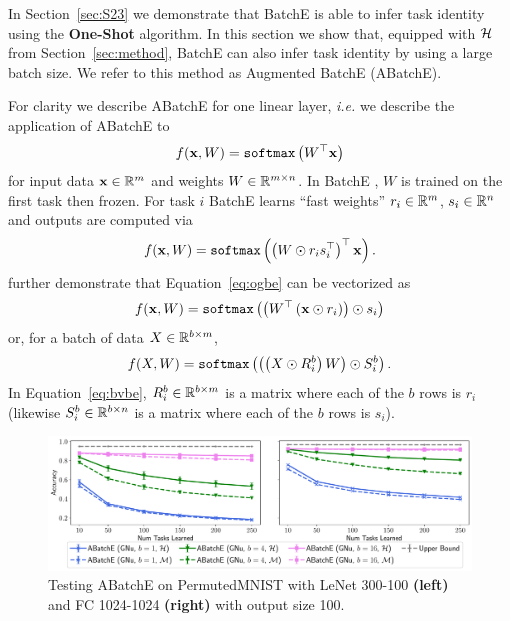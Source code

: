 \documentclass{article}
\begin{document}
In Section~\ref{sec:S23} we demonstrate that BatchE \cite{wen2020batchensemble} is able to infer task identity using the \textbf{One-Shot} algorithm. In this section we show that, equipped with $\mathcal{H}$ from Section~\ref{sec:method}, BatchE can also infer task identity by using a large batch size. We refer to this method as Augmented BatchE (ABatchE).

For clarity we describe ABatchE for one linear layer, \textit{i.e.} we describe the application of ABatchE to
\begin{align}
    f(\mathbf{x}, W) = \texttt{softmax}\left( W^\top \mathbf{x} \right)
\end{align}
for input data $\mathbf{x} \in \mathbb{R}^m$ and weights  $W \in \mathbb{R}^{m \times n}$. In BatchE \cite{wen2020batchensemble}, $W$ is trained on the first task then frozen. For task $i$ BatchE learns ``fast weights'' $r_i \in \mathbb{R}^{m}$, $s_i \in \mathbb{R}^{n}$ and outputs are computed via
\begin{align} \label{eq:ogbe}
    f(\mathbf{x}, W) = \texttt{softmax}\left( \left( W \odot r_i s_i^\top   \right)^\top \mathbf{x} \right).
\end{align}
\citet{wen2020batchensemble} further demonstrate that Equation~\ref{eq:ogbe} can be vectorized as
\begin{align} \label{eq:vbe}
    f(\mathbf{x}, W) = \texttt{softmax}\left(  \left( W^\top \left( \mathbf{x} \odot r_i  \right) \right) \odot s_i  \right)
\end{align}
or, for a batch of data $X \in \mathbb{R}^{b \times m}$,
\begin{align} \label{eq:bvbe}
    f(X, W) = \texttt{softmax}\left(  \left( \left( X \odot R^{b}_i  \right)  W \right) \odot S^{b}_i  \right).
\end{align}
In Equation~\ref{eq:bvbe}, $R^b_i \in \mathbb{R}^{b \times m}$ is a matrix where each of the $b$ rows is $r_i$ (likewise $S^b_i \in \mathbb{R}^{b \times n}$ is a matrix where each of the $b$ rows is $s_i$).
\begin{figure}[t]
    \centering
    \includegraphics[width=\textwidth]{figs/abe.pdf}
    \caption{Testing ABatchE on PermutedMNIST with LeNet 300-100 \textbf{(left)} and FC 1024-1024 \textbf{(right)} with output size 100.}
    \label{fig:abe}
    \vspace{-1.5em}
\end{figure}
\end{document}
